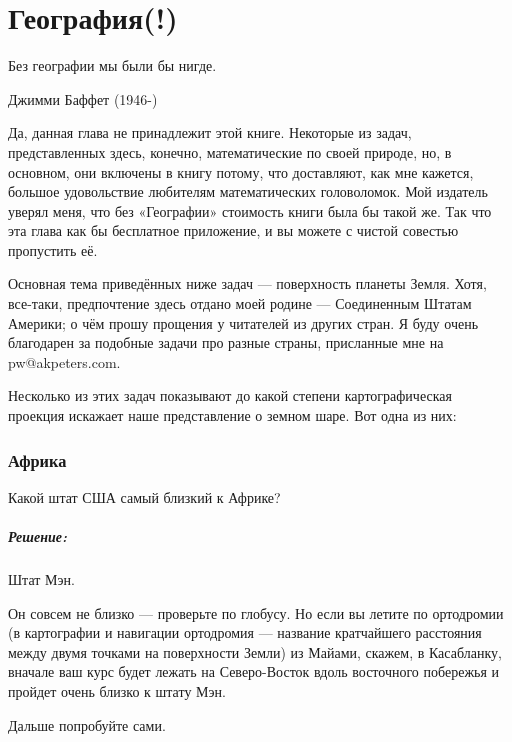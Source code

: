 \chapter*{География(!)}

\epigraph{Без географии  мы были бы нигде.}{Джимми Баффет (1946-)}%


Да, данная глава не принадлежит этой книге. %
Некоторые из задач, представленных здесь, конечно, математические по своей природе, %
но,  в основном, они включены в книгу потому, что доставляют, как  мне кажется, большое удовольствие любителям математических головоломок.  Мой издатель уверял меня, что без «Географии» стоимость книги была бы такой же. 
Так что эта глава  как бы бесплатное приложение, и вы можете с чистой совестью  пропустить её.


Основная тема приведённых ниже задач ---  поверхность планеты Земля. Хотя, все-таки, предпочтение здесь отдано моей родине --- Соединенным Штатам Америки;  о чём прошу прощения у читателей из других стран. Я буду очень благодарен за подобные задачи про разные страны, присланные мне на pw@akpeters.com.     


Несколько из этих задач показывают до какой степени %
картографическая проекция %
искажает наше представление о земном шаре. %
Вот одна из них:


\subsection*{Африка}


Какой штат США самый близкий к Африке?


\paragraph{Решение:}  Штат Мэн.\heart
                                  
Он совсем не близко --- проверьте по глобусу.  Но если вы летите по ортодромии  (в картографии и навигации ортодромия --- название кратчайшего расстояния между двумя точками на поверхности Земли)  из Майами, скажем, в Касабланку,  вначале ваш курс %
будет лежать  на Северо-Восток вдоль восточного побережья и пройдет очень близко к штату Мэн.

\medskip

Дальше попробуйте  сами.


